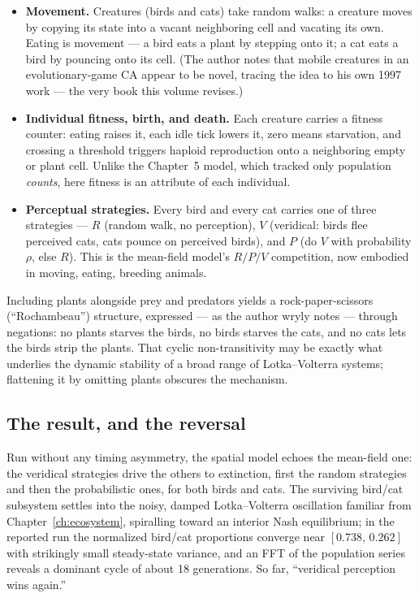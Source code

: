 \begin{itemize}
\item \textbf{Movement.} Creatures (birds and cats) take random walks: a
  creature moves by copying its state into a vacant neighboring cell and
  vacating its own.  Eating is movement --- a bird eats a plant by
  stepping onto it; a cat eats a bird by pouncing onto its cell.  (The
  author notes that mobile creatures in an evolutionary-game CA appear
  to be novel, tracing the idea to his own 1997 work --- the very book
  this volume revises.)
\item \textbf{Individual fitness, birth, and death.} Each creature
  carries a fitness counter: eating raises it, each idle tick lowers it,
  zero means starvation, and crossing a threshold triggers haploid
  reproduction onto a neighboring empty or plant cell.  Unlike the
  Chapter~5 model, which tracked only population \emph{counts}, here
  fitness is an attribute of each individual.
\item \textbf{Perceptual strategies.} Every bird and every cat carries
  one of three strategies --- $R$ (random walk, no perception), $V$
  (veridical: birds flee perceived cats, cats pounce on perceived
  birds), and $P$ (do $V$ with probability $\rho$, else $R$).  This is
  the mean-field model's $R/P/V$ competition, now embodied in moving,
  eating, breeding animals.
\end{itemize}

Including plants alongside prey and predators yields a
rock-paper-scissors (``Rochambeau'') structure, expressed --- as the
author wryly notes --- through negations: no plants starves the birds,
no birds starves the cats, and no cats lets the birds strip the plants.
That cyclic non-transitivity may be exactly what underlies the dynamic
stability of a broad range of Lotka--Volterra systems; flattening it by
omitting plants obscures the mechanism.

\subsection*{The result, and the reversal}

Run without any timing asymmetry, the spatial model echoes the
mean-field one: the veridical strategies drive the others to extinction,
first the random strategies and then the probabilistic ones, for both
birds and cats.  The surviving bird/cat subsystem settles into the noisy,
damped Lotka--Volterra oscillation familiar from
Chapter~\ref{ch:ecosystem}, spiralling toward an interior Nash
equilibrium; in the reported run the normalized bird/cat proportions
converge near $[0.738,\, 0.262]$ with strikingly small steady-state
variance, and an FFT of the population series reveals a dominant cycle of
about 18 generations.  So far, ``veridical perception wins again.''

